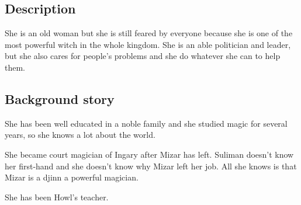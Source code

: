 \subsection{Description}
She is an old woman but she is still feared by everyone because she is one of the most powerful witch in the whole kingdom. She is an able politician and leader, but she also cares for people's problems and she do whatever she can to help them.

\subsection{Background story}
She has been well educated in a noble family and she studied magic for several years, so she knows a lot about the world.

She became court magician of Ingary after Mizar has left. Suliman doesn't know her first-hand and she doesn't know why Mizar left her job. All she knows is that Mizar is a djinn a powerful magician.

She has been Howl's teacher.
